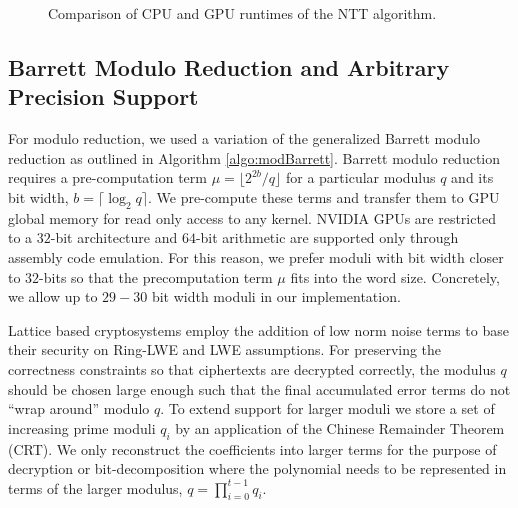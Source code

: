 
\begin{figure}
\centering
{}
\caption{Comparison of CPU and GPU runtimes of the NTT algorithm.}
\label{fig:cpugpuRunTimes}
\end{figure}

\subsection{Barrett Modulo Reduction and Arbitrary Precision Support}

For modulo reduction, we used a variation of the generalized Barrett modulo reduction  \cite{dhem1998recent} as outlined in Algorithm \ref{algo:modBarrett}. Barrett modulo reduction requires a pre-computation term $\mu = \lfloor 2^{2b} / q\rfloor$ for a particular modulus $q$ and its bit width, $b = \lceil \log_2{q}\rceil$. We pre-compute these terms and transfer them to GPU global memory for read only access to any kernel. NVIDIA GPUs are restricted to a $32$-bit architecture and $64$-bit arithmetic are supported only through assembly code emulation. For this reason, we prefer moduli with bit width closer to $32$-bits so that the precomputation term $\mu$ fits into the word size. Concretely, we allow up to $29-30$ bit width moduli in our implementation. 

Lattice based cryptosystems employ the addition of low norm noise terms to base their security on Ring-LWE and LWE assumptions. For preserving the correctness constraints so that ciphertexts are decrypted correctly, the modulus $q$ should be chosen large enough such that the final accumulated error terms do not ``wrap around'' modulo $q$. To extend support for larger moduli we store a set of increasing prime moduli $q_i$ by an application of the Chinese Remainder Theorem (CRT). We only reconstruct the coefficients into larger terms for the purpose of decryption or bit-decomposition where the polynomial needs to be represented in terms of the larger modulus, $q = \prod_{i=0}^{t-1} q_i$.

